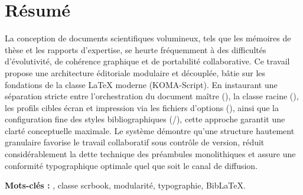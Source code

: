 
\section*{Résumé}

La conception de documents scientifiques volumineux, tels que les mémoires de thèse et les rapports d'expertise,
se heurte fréquemment à des difficultés d'évolutivité, de cohérence graphique et de portabilité collaborative.
Ce travail propose une architecture éditoriale modulaire et découplée,
bâtie sur les fondations de la classe \LaTeX{} moderne  (KOMA-Script).
En instaurant une séparation stricte entre l'orchestration du document maître (),
la classe racine (),
les profils cibles écran et impression via les fichiers d'options (),
ainsi que la configuration fine des styles bibliographiques (/),
cette approche garantit une clarté conceptuelle maximale.
Le système démontre qu'une structure hautement granulaire favorise le travail collaboratif sous contrôle de version,
réduit considérablement la dette technique des préambules monolithiques
et assure une conformité typographique optimale quel que soit le canal de diffusion.

\vspace{0.8em}
\noindent\textbf{Mots-clés :} \getkeywords, classe scrbook, modularité, typographie, Bib\LaTeX.

\vspace{1.5cm}

